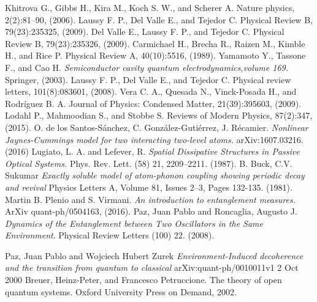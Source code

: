 \begin{thebibliography}{9}
Khitrova G., Gibbs H., Kira M., Koch S. W., and Scherer A. Nature physics, 2(2):81–90, (2006).
Laussy F. P., Del Valle E., and Tejedor C. Physical Review B, 79(23):235325, (2009).
 Del Valle E., Laussy F. P., and Tejedor C. Physical Review B, 79(23):235326, (2009).
Carmichael H., Brecha R., Raizen M., Kimble H., and Rice P. Physical Review A, 40(10):5516, (1989).
Yamamoto Y., Tassone F., and Cao H. 
\textit{Semiconductor cavity quantum electrodynamics,volume 169.}
Springer, (2003).
Laussy F. P., Del Valle E., and Tejedor C. Physical review letters, 101(8):083601, (2008).
 Vera C. A., Quesada N., Vinck-Posada H., and Rodríguez B. A. Journal of Physics: Condensed Matter, 21(39):395603, (2009).
Lodahl P., Mahmoodian S., and Stobbe S. Reviews of Modern Physics, 87(2):347, (2015).
O. de los Santos-Sánchez, C. González-Gutiérrez, J. Récamier. \textit{Nonlinear Jaynes-Cummings model for two interacting two-level atoms.} arXiv:1607.03216. (2016)
Lugiato, L. A. and Lefever, R. \textit{Spatial Dissipative Structures in Passive Optical Systems.} Phys. Rev. Lett. (58) 21, 2209--2211. (1987).
B. Buck, C.V. Sukumar \textit{Exactly soluble model of atom-phonon coupling showing periodic decay and revival} Physics Letters A, Volume 81, Issues 2–3,  Pages 132-135. (1981).
Martin B. Plenio and S. Virmani. 
\textit{An introduction to entanglement measures.}
ArXiv quant-ph/0504163, (2016).
Paz, Juan Pablo and Roncaglia, Augusto J. \textit{Dynamics of the Entanglement between Two Oscillators in the Same Environment}. Physical Review Letters (100) 22. (2008). 

Paz, Juan Pablo and Wojciech Hubert Zurek \textit{Environment-Induced decoherence and the transition from quantum to classical}  arXiv:quant-ph/0010011v1  2 Oct 2000
 Breuer, Heinz-Peter, and Francesco Petruccione. The theory of open quantum systems. Oxford University Press on Demand, 2002.





\end{thebibliography}
